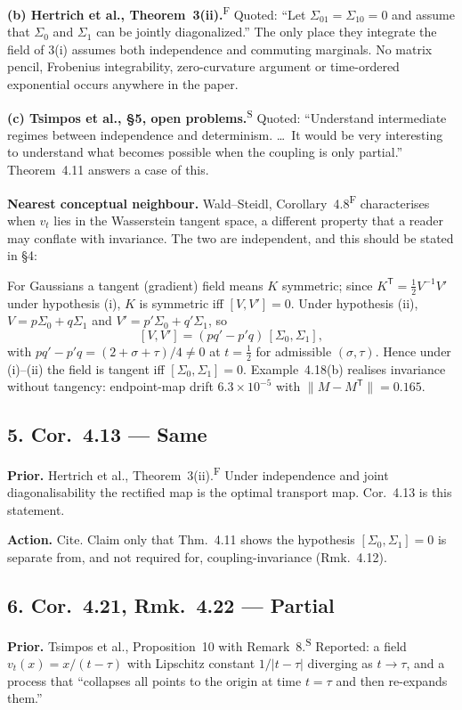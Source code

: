 \documentclass[11pt]{article}
\newcommand{\F}{\textsuperscript{F}}
\newcommand{\Sec}{\textsuperscript{S}}
\newcommand{\T}{\mathsf{T}}
\begin{document}
\textbf{(b) Hertrich et al., Theorem~3(ii).}\F{} Quoted: ``Let $\Sigma_{01}=\Sigma_{10}=0$ and
assume that $\Sigma_0$ and $\Sigma_1$ can be jointly diagonalized.'' The only place they integrate
the field of 3(i) assumes both independence and commuting marginals. No matrix pencil, Frobenius
integrability, zero-curvature argument or time-ordered exponential occurs anywhere in the paper.

\textbf{(c) Tsimpos et al., \S5, open problems.}\Sec{} Quoted: ``Understand intermediate regimes
between independence and determinism. \dots\ It would be very interesting to understand what
becomes possible when the coupling is only partial.'' Theorem~4.11 answers a case of this.

\textbf{Nearest conceptual neighbour.} Wald--Steidl, Corollary~4.8\F{} characterises when
$v_t$ lies in the Wasserstein tangent space, a different property that a reader may conflate with
invariance. The two are independent, and this should be stated in \S4:

For Gaussians a tangent (gradient) field means $K$ symmetric; since $K^{\T}=\tfrac12V^{-1}V'$
under hypothesis (i), $K$ is symmetric iff $[V,V']=0$. Under hypothesis (ii),
$V=p\Sigma_0+q\Sigma_1$ and $V'=p'\Sigma_0+q'\Sigma_1$, so
\[
[V,V']=(pq'-p'q)\,[\Sigma_0,\Sigma_1],
\]
with $pq'-p'q=(2+\sigma+\tau)/4\neq0$ at $t=\tfrac12$ for admissible $(\sigma,\tau)$. Hence under
(i)--(ii) the field is tangent iff $[\Sigma_0,\Sigma_1]=0$. Example~4.18(b) realises invariance
without tangency: endpoint-map drift $6.3\times10^{-5}$ with $\|M-M^{\T}\|=0.165$.

\subsection*{5. Cor.~4.13 --- Same}

\textbf{Prior.} Hertrich et al., Theorem~3(ii).\F{} Under independence and joint
diagonalisability the rectified map is the optimal transport map. Cor.~4.13 is this statement.

\textbf{Action.} Cite. Claim only that Thm.~4.11 shows the hypothesis $[\Sigma_0,\Sigma_1]=0$ is
separate from, and not required for, coupling-invariance (Rmk.~4.12).

\subsection*{6. Cor.~4.21, Rmk.~4.22 --- Partial}

\textbf{Prior.} Tsimpos et al., Proposition~10 with Remark~8.\Sec{} Reported: a field
$v_t(x)=x/(t-\tau)$ with Lipschitz constant $1/|t-\tau|$ diverging as $t\to\tau$, and a process
that ``collapses all points to the origin at time $t=\tau$ and then re-expands them.''
\end{document}
